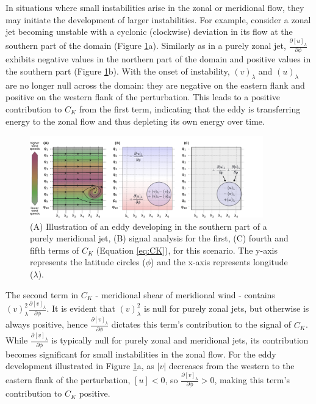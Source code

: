 In situations where small instabilities arise in the zonal or meridional flow, they may initiate the development of larger instabilities. For example, consider a zonal jet becoming unstable with a cyclonic (clockwise) deviation in its flow at the southern part of the domain (Figure \ref{fig:Ck_2}a). Similarly as in a purely zonal jet, \( \frac{\partial [u]_\lambda}{\partial \phi} \) exhibits negative values in the northern part of the domain and positive values in the southern part (Figure \ref{fig:Ck_2}b). With the onset of instability, \( (v)_\lambda \) and \( (u)_\lambda \) are no longer null across the domain: they are negative on the eastern flank and positive on the western flank of the perturbation. This leads to a positive contribution to \( C_K \) from the first term, indicating that the eddy is transferring energy to the zonal flow and thus depleting its own energy over time.

\begin{figure}[h]
\begin{center}
\includegraphics[width=0.9\textwidth]{fig/Ck_2.pdf}
\caption[Meridional jet - eddy]{(A) Illustration of an eddy developing in the southern part of a purely meridional jet, (B) signal analysis for the first, (C) fourth and fifth terms of \( C_K \) (Equation \ref{eq:CK}), for this scenario. The y-axis represents the latitude circles (\(\phi\)) and the x-axis represents longitude (\(\lambda\)).}
\label{fig:Ck_2}
\end{center}
\end{figure}

The second term in \( C_K \) - meridional shear of meridional wind - contains \( (v)^{2}_\lambda \frac{\partial [v]_\lambda}{\partial \phi} \). It is evident that \( (v)^{2}_\lambda \) is null for purely zonal jets, but otherwise is always positive, hence \( \frac{\partial [v]_\lambda}{\partial \phi} \) dictates this term's contribution to the signal of \( C_K \). While \( \frac{\partial [v]_\lambda}{\partial \phi} \) is typically null for purely zonal and meridional jets, its contribution becomes significant for small instabilities in the zonal flow. For the eddy development illustrated in Figure \ref{fig:Ck_2}a, as \( |v| \) decreases from the western to the eastern flank of the perturbation, \( [u] < 0 \), so \( \frac{\partial [v]_\lambda}{\partial \phi} > 0 \), making this term's contribution to \( C_K \) positive.

